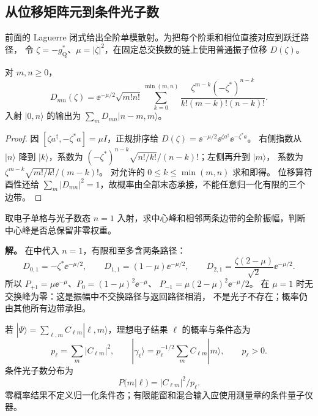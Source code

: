 \subsection{从位移矩阵元到条件光子数}
前面的 Laguerre 闭式给出全阶单模散射。为把每个阶乘和相位直接对应到跃迁路径，
令 $\zeta=-g_{\mathrm Q}^*$、$\mu=|\zeta|^2$，在固定总交换数的链上使用普通振子位移 $D(\zeta)$。
\begin{proposition}[有限和形式的位移振幅]
对 $m,n\ge0$，
\begin{equation}
 D_{mn}(\zeta)=\ee^{-\mu/2}\sqrt{m!n!}
 \sum_{k=0}^{\min(m,n)}
 \frac{\zeta^{m-k}(-\zeta^*)^{n-k}}{k!(m-k)!(n-k)!}.
 \label{eq:feqo-displacement-matrix}
\end{equation}
入射 $|0,n\rangle$ 的输出为 $\sum_mD_{mn}|n-m,m\rangle$。
\end{proposition}
\begin{proof}
因 $[\zeta a^\dagger,-\zeta^*a]=\mu I$，正规排序给
$D(\zeta)=\ee^{-\mu/2}\ee^{\zeta a^\dagger}\ee^{-\zeta^*a}$。
右侧指数从 $|n\rangle$ 降到 $|k\rangle$，系数为
$(-\zeta^*)^{n-k}\sqrt{n!/k!}/(n-k)!$；左侧再升到 $|m\rangle$，
系数为 $\zeta^{m-k}\sqrt{m!/k!}/(m-k)!$。
对允许的 $0\le k\le\min(m,n)$ 求和即得。
位移算符酉性还给 $\sum_m|D_{mn}|^2=1$，故概率由全部末态承接，不能任意归一化有限的三个边带。
\end{proof}

\begin{exbox}[单光子输入的中心峰相消]
取电子单格与光子数态 $n=1$ 入射，求中心峰和相邻两条边带的全阶振幅，判断中心峰是否总保留非零权重。

\textbf{解。} 在中代入 $n=1$，有限和至多含两条路径：
\begin{equation}
 D_{0,1}=-\zeta^*\ee^{-\mu/2},\qquad
 D_{1,1}=(1-\mu)\ee^{-\mu/2},\qquad
 D_{2,1}=\frac{\zeta(2-\mu)}{\sqrt2}\ee^{-\mu/2}.
 \label{eq:feqo-single-photon-exact-amplitudes}
\end{equation}
所以 $P_{+1}=\mu\ee^{-\mu}$、$P_0=(1-\mu)^2\ee^{-\mu}$、
$P_{-1}=\mu(2-\mu)^2\ee^{-\mu}/2$。
在 $\mu=1$ 时无交换峰为零：这是振幅中不交换路径与返回路径相消，
不是光子不存在；概率仍由其他所有边带承担。
\end{exbox}

\begin{definition}[电子结果对应的条件光态]
若 $|\Psi\rangle=\sum_{\ell,m}C_{\ell m}|\ell,m\rangle$，理想电子结果 $\ell$ 的概率与条件态为
\begin{equation}
 p_\ell=\sum_m|C_{\ell m}|^2,\qquad
 |\gamma_\ell\rangle=p_\ell^{-1/2}\sum_mC_{\ell m}|m\rangle,\qquad p_\ell>0.
 \label{eq:feqo-conditional-photon-state}
\end{equation}
条件光子数分布为
\begin{equation}
 P(m|\ell)=|C_{\ell m}|^2/p_\ell.
 \label{eq:feqo-conditional-photon-number}
\end{equation}
零概率结果不定义归一化条件态；有限能窗和混合输入应使用测量章的条件量子仪器。
\end{definition}

